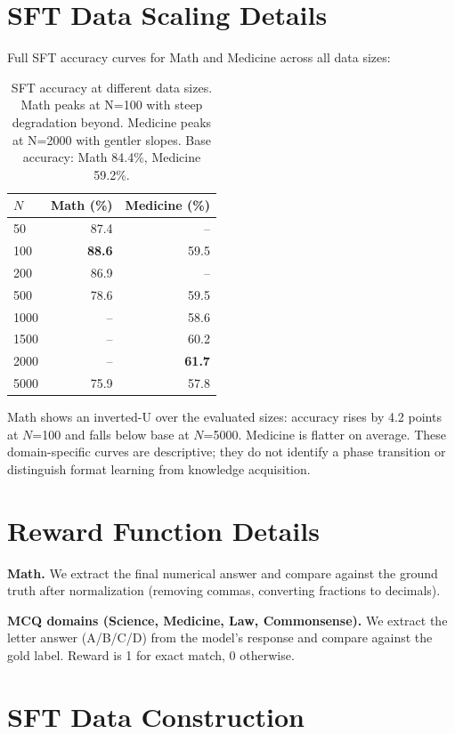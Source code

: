 \documentclass[11pt]{article}
\begin{document}
\section{SFT Data Scaling Details}
\label{sec:sft_scaling}

Full SFT accuracy curves for Math and Medicine across all data sizes:

\begin{table}[h]
\centering
\small
\begin{tabular}{lrr}
\toprule
\textbf{$N$} & \textbf{Math (\%)} & \textbf{Medicine (\%)} \\
\midrule
50 & 87.4 & -- \\
100 & \textbf{88.6} & 59.5 \\
200 & 86.9 & -- \\
500 & 78.6 & 59.5 \\
1000 & -- & 58.6 \\
1500 & -- & 60.2 \\
2000 & -- & \textbf{61.7} \\
5000 & 75.9 & 57.8 \\
\bottomrule
\end{tabular}
\caption{SFT accuracy at different data sizes. Math peaks at N=100 with steep degradation beyond. Medicine peaks at N=2000 with gentler slopes. Base accuracy: Math 84.4\%, Medicine 59.2\%.}
\label{tab:sft_scaling}
\end{table}

Math shows an inverted-U over the evaluated sizes: accuracy rises by 4.2 points at $N$=100 and falls below base at $N$=5000. Medicine is flatter on average. These domain-specific curves are descriptive; they do not identify a phase transition or distinguish format learning from knowledge acquisition.

\section{Reward Function Details}
\label{sec:rewards}

\textbf{Math.} We extract the final numerical answer and compare against the ground truth after normalization (removing commas, converting fractions to decimals).

\textbf{MCQ domains (Science, Medicine, Law, Commonsense).} We extract the letter answer (A/B/C/D) from the model's response and compare against the gold label. Reward is 1 for exact match, 0 otherwise.

\section{SFT Data Construction}
\label{sec:sft_data}
\end{document}
